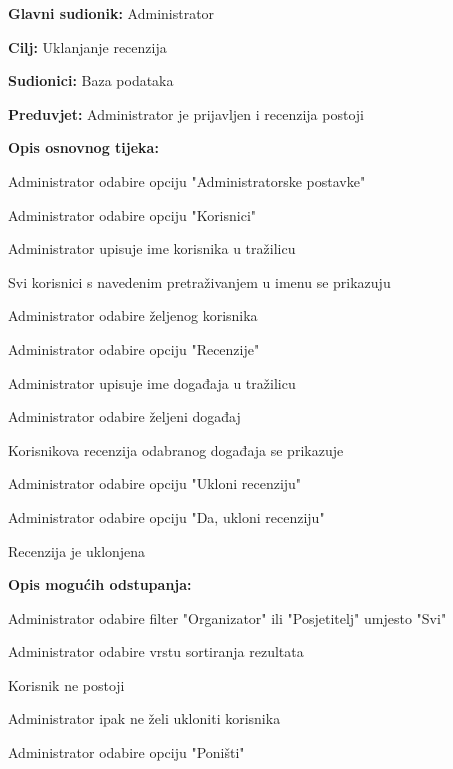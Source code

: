 					\noindent {}
					\begin{packed_item}
	
						\item \textbf{Glavni sudionik:} Administrator
						\item  \textbf{Cilj:} Uklanjanje recenzija
						\item  \textbf{Sudionici:} Baza podataka
						\item  \textbf{Preduvjet:} Administrator je prijavljen i recenzija postoji
						\item  \textbf{Opis osnovnog tijeka:}
						
						\item[] \begin{packed_enum}
	
							\item Administrator odabire opciju "Administratorske postavke"
							\item Administrator odabire opciju "Korisnici"
							\item Administrator upisuje ime korisnika u tražilicu
							\item Svi korisnici s navedenim pretraživanjem u imenu se prikazuju
							\item Administrator odabire željenog korisnika
							\item Administrator odabire opciju "Recenzije"
							\item Administrator upisuje ime događaja u tražilicu
							\item Administrator odabire željeni događaj
							\item Korisnikova recenzija odabranog događaja se prikazuje
							\item Administrator odabire opciju "Ukloni recenziju"
							\item Administrator odabire opciju "Da, ukloni recenziju"
							\item Recenzija je uklonjena
						\end{packed_enum}
						
						\item  \textbf{Opis mogućih odstupanja:}
						
						\item[] \begin{packed_item}
	
							\item[3.a] Administrator odabire filter "Organizator" ili "Posjetitelj" umjesto "Svi"
							\item[3.b] Administrator odabire vrstu sortiranja rezultata
							\item[4.a] Korisnik ne postoji
							\item[11.a] Administrator ipak ne želi ukloniti korisnika
							\item[] \begin{packed_enum}
								
								\item Administrator odabire opciju "Poništi"
								
							\end{packed_enum}
						\end{packed_item}
					\end{packed_item}

